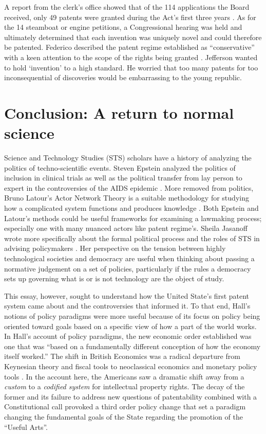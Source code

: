 \documentclass[12pt,letterpaper]{article}
\begin{document}
{A report from the clerk's office showed that of the 114 applications the Board received, only 49 patents were granted during the Act's first three years \autocite[246]{Federico1936}. As for the 14 steamboat or engine petitions, a Congressional hearing was held and ultimately determined that each invention was uniquely novel and could therefore be patented. Federico described the patent regime established as ``conservative'' with a keen attention to the scope of the rights being granted \autocite[]{Federico1936}. Jefferson wanted to hold `invention' to a high standard. He worried that too many patents for too inconsequential of discoveries would be embarrassing to the young republic.

\section{Conclusion: A return to normal science}

Science and Technology Studies (STS) scholars have a history of analyzing the politics of techno-scientific events. Steven Epstein analyzed the politics of inclusion in clinical trials as well as the political transfer from lay person to expert in the controversies of the AIDS epidemic \autocite{Epstein2009, Epstein1995}. More removed from politics, Bruno Latour's Actor Network Theory is a suitable methodology for studying how a complicated system functions and produces knowledge \autocite{Latour1988}. Both Epstein and Latour's methods could be useful frameworks for examining a lawmaking process; especially one with many nuanced actors like patent regime's. Sheila Jasanoff wrote more specifically about the formal political process and the roles of STS in advising policymakers \autocite{Jasanoff2011}. Her perspective on the tension between highly technological societies and democracy are useful when thinking about passing a normative judgement on a set of policies, particularly if the rules a democracy sets up governing what is or is not technology are the object of study.

This essay, however, sought to understand how the United State's first patent system came about and the controversies that informed it. To that end, Hall's notions of policy paradigms were more useful because of its focus on policy being oriented toward goals based on a specific view of how a part of the world works. In Hall's account of policy paradigms, the new economic order established was one that was ``based on a fundamentally different conception of how the economy itself worked.'' The shift in British Economics was a radical departure from Keynesian theory and fiscal tools to neoclassical economics and monetary policy tools \autocite{Hall1993}. In the account here, the Americans saw a dramatic shift away from a \emph{custom} to a \emph{codified system} for intellectual property rights. The decay of the former and its failure to address new questions of patentability combined with a Constitutional call provoked a third order policy change that set a paradigm changing the fundamental goals of the State regarding the promotion of the ``Useful Arts''.

}
\end{document}
